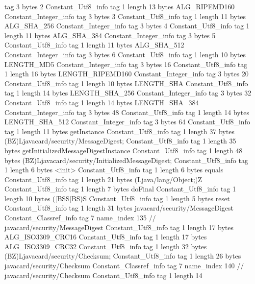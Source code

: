{{{			tag	3
			bytes	2
		}
		Constant_Utf8_info {
			tag	1
			length	13
			bytes	ALG_RIPEMD160
		}
		Constant_Integer_info {
			tag	3
			bytes	3
		}
		Constant_Utf8_info {
			tag	1
			length	11
			bytes	ALG_SHA_256
		}
		Constant_Integer_info {
			tag	3
			bytes	4
		}
		Constant_Utf8_info {
			tag	1
			length	11
			bytes	ALG_SHA_384
		}
		Constant_Integer_info {
			tag	3
			bytes	5
		}
		Constant_Utf8_info {
			tag	1
			length	11
			bytes	ALG_SHA_512
		}
		Constant_Integer_info {
			tag	3
			bytes	6
		}
		Constant_Utf8_info {
			tag	1
			length	10
			bytes	LENGTH_MD5
		}
		Constant_Integer_info {
			tag	3
			bytes	16
		}
		Constant_Utf8_info {
			tag	1
			length	16
			bytes	LENGTH_RIPEMD160
		}
		Constant_Integer_info {
			tag	3
			bytes	20
		}
		Constant_Utf8_info {
			tag	1
			length	10
			bytes	LENGTH_SHA
		}
		Constant_Utf8_info {
			tag	1
			length	14
			bytes	LENGTH_SHA_256
		}
		Constant_Integer_info {
			tag	3
			bytes	32
		}
		Constant_Utf8_info {
			tag	1
			length	14
			bytes	LENGTH_SHA_384
		}
		Constant_Integer_info {
			tag	3
			bytes	48
		}
		Constant_Utf8_info {
			tag	1
			length	14
			bytes	LENGTH_SHA_512
		}
		Constant_Integer_info {
			tag	3
			bytes	64
		}
		Constant_Utf8_info {
			tag	1
			length	11
			bytes	getInstance
		}
		Constant_Utf8_info {
			tag	1
			length	37
			bytes	(BZ)Ljavacard/security/MessageDigest;
		}
		Constant_Utf8_info {
			tag	1
			length	35
			bytes	getInitializedMessageDigestInstance
		}
		Constant_Utf8_info {
			tag	1
			length	48
			bytes	(BZ)Ljavacard/security/InitializedMessageDigest;
		}
		Constant_Utf8_info {
			tag	1
			length	6
			bytes	<init>
		}
		Constant_Utf8_info {
			tag	1
			length	6
			bytes	equals
		}
		Constant_Utf8_info {
			tag	1
			length	21
			bytes	(Ljava/lang/Object;)Z
		}
		Constant_Utf8_info {
			tag	1
			length	7
			bytes	doFinal
		}
		Constant_Utf8_info {
			tag	1
			length	10
			bytes	([BSS[BS)S
		}
		Constant_Utf8_info {
			tag	1
			length	5
			bytes	reset
		}
		Constant_Utf8_info {
			tag	1
			length	31
			bytes	javacard/security/MessageDigest
		}
		Constant_Classref_info {
			tag	7
			name_index	135		// javacard/security/MessageDigest
		}
		Constant_Utf8_info {
			tag	1
			length	17
			bytes	ALG_ISO3309_CRC16
		}
		Constant_Utf8_info {
			tag	1
			length	17
			bytes	ALG_ISO3309_CRC32
		}
		Constant_Utf8_info {
			tag	1
			length	32
			bytes	(BZ)Ljavacard/security/Checksum;
		}
		Constant_Utf8_info {
			tag	1
			length	26
			bytes	javacard/security/Checksum
		}
		Constant_Classref_info {
			tag	7
			name_index	140		// javacard/security/Checksum
		}
		Constant_Utf8_info {
			tag	1
			length	14
}}}
